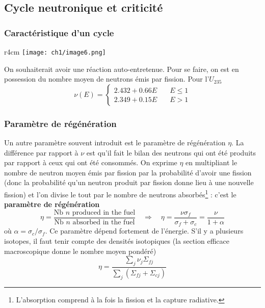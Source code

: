 \subsection{Cycle neutronique et criticité}
\subsubsection{Caractéristique d'un cycle}
	\begin{wrapfigure}[7]{r}{4cm}
	\vspace{-5mm}
	\texttt{[image: ch1/image6.png]}
	\end{wrapfigure}
On souhaiterait avoir une réaction auto-entretenue. Pour se faire, on est en possession du nombre 
moyen de neutrons émis par fission. Pour l'$U_{235}$
\begin{equation}
\nu(E) = \left\{\begin{array}{ll}
2.432 +0.66E&\quad E\leq 1\\
2.349+0.15E&\quad E>1
\end{array}\right.
\end{equation}

\subsubsection{Paramètre de régénération}
Un autre paramètre souvent introduit est le paramètre de régénération $\eta$. La différence par rapport à $\nu$ est qu'il 
fait le bilan des neutrons qui ont été produits par rapport à ceux qui ont été consommés.
On exprime $\eta$ en multipliant le nombre de neutron moyen émis par
fission par la probabilité d'avoir une fission (donc la probabilité qu'un neutron produit par 
fission donne lieu à une nouvelle fission) et l'on divise le tout par le nombre de neutrons
absorbés\footnote{L'absorption comprend à la fois la fission et la capture radiative.} : c'est le \textbf{paramètre de régénération}
\begin{equation}
\eta = \dfrac{\text{Nb $n$ produced in the fuel}}{\text{Nb $n$ absorbed in the fuel}}\quad\Rightarrow
\quad \eta = \dfrac{\nu\sigma_f}{\sigma_f+\sigma_c}=\dfrac{\nu}{1+\alpha}
\end{equation}
où $\alpha = \sigma_c/\sigma_f$. Ce paramètre dépend fortement de l'énergie. S'il y a plusieurs 
isotopes, il faut tenir compte des densités isotopiques (la section efficace macroscopique donne
le nombre moyen pondéré)
\begin{equation}
\eta = \dfrac{\sum_j\nu_j\Sigma_{fj}}{\sum_j \left(\Sigma_{fj}+\Sigma_{cj}\right)}
\end{equation}


